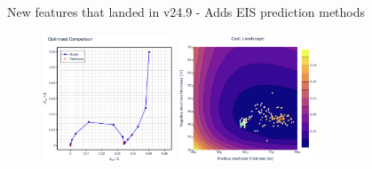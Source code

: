 \documentclass[aspectratio=169]{beamer}
\begin{document}
\begin{frame}[fragile,t]{New features that landed in v24.9}
    \vspace{-6mm}
         - Adds EIS prediction methods

    \begin{figure}
        \centering
        \includegraphics[width=0.35\textwidth]{Images/Highlights/nyquist-eis-identification.png}
        \hspace{3em}
        \includegraphics[width=0.37\textwidth]{Images/Highlights/eis-identification-landscape.png}
        \label{fig:WeppnerHuggins}
    \end{figure}
\end{frame}
\end{document}
